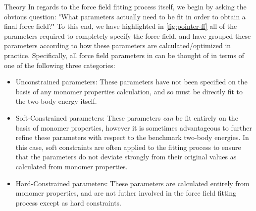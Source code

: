 \begin{subsection}{Theory}
In regards to the force field fitting process itself, we begin by asking the obvious
question: "What parameters actually need to be fit in order to obtain a final
force field?" To this end, we have highlighted in \cref{fig:pointer-ff} all
of the parameters required to completely specify the \mastiff force field, and
have grouped these parameters according to how these parameters are
calculated/optimized
in practice. Specifically, all force field parameters in \mastiff can be thought
of in terms of one of the following three categories:
%
\begin{itemize}
\item \textcolor{fit}{Unconstrained} parameters: These parameters have not
been specified on the basis of any monomer properties calculation, and so must
be directly fit to the two-body energy itself. 
%
\item \textcolor{cfit}{Soft-Constrained} parameters: These parameters
\emph{can} be fit entirely on the basis of monomer properties, however it is
sometimes advantageous to further refine these parameters with respect to the
benchmark two-body energies. In this case, soft
constraints\cite{Misquitta2016} are often applied to
the fitting process to ensure that the parameters do not deviate strongly from
their original values as calculated from monomer properties.
%
\item \textcolor{mon}{Hard-Constrained} parameters: These parameters are calculated
entirely from monomer properties, and are not futher involved in the force
field fitting process except as hard constraints.
\end{itemize}


\end{subsection}
